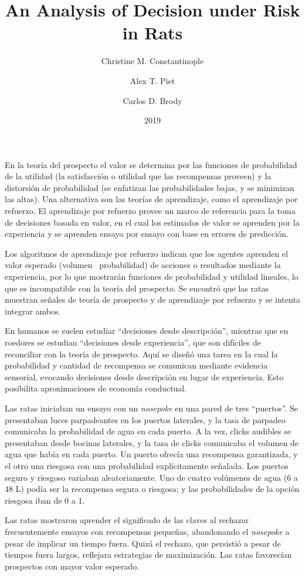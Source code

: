\documentclass[a4paper,12pt]{article}
\title{An Analysis of Decision under Risk in Rats}
\author{Christine M. Constantinople \and Alex T. Piet \and Carlos D. Brody}
\date{2019}
\begin{document}
{\scshape\bfseries \maketitle}

En la teoría del prospecto el valor se determina por las funciones de probabilidad de la utilidad (la satisfacción o utilidad que las recompensas proveen) y la distorsión de probabilidad (se enfatizan las probabilidades bajas, y se minimizan las altas).
Una alternativa son las teorías de aprendizaje, como el aprendizaje por refuerzo.
El aprendizaje por refuerzo provee un marco de referencia para la toma de decisiones basada en valor, en el cual los estimados de valor se aprenden por la experiencia y se aprenden ensayo por ensayo con base en errores de predicción.

Los algoritmos de aprendizaje por refuerzo indican que los agentes aprenden el valor esperado (volumen \texttimes\ probabilidad) de acciones o resultados mediante la experiencia, por lo que mostrarán funciones de probabilidad y utilidad lineales, lo que es incompatible con la teoría del prospecto.
Se encontró que las ratas muestran señales de teoría de prospecto y de aprendizaje por refuerzo y se intenta integrar ambos.

En humanos se suelen estudiar ``decisiones desde descripción'', mientras que en roedores se estudian ``decisiones desde experiencia'', que son difíciles de reconciliar con la teoría de prospecto.
Aquí se diseñó una tarea en la cual la probabilidad y cantidad de recompensa se comunican mediante evidencia sensorial, evocando decisiones desde descripción en lugar de experiencia.
Esto posibilita aproximaciones de economía conductual.

Las ratas iniciaban un ensayo con un {\itshape nosepoke} en una pared de tres ``puertos''.
Se presentaban luces parpadeantes en los puertos laterales, y la tasa de parpadeo comunicaba la probabilidad de agua en cada puerto.
A la vez, clicks audibles se presentaban desde bocinas laterales, y la tasa de clicks comunicaba el volumen de agua que había en cada puerto.
Un puerto ofrecía una recompensa garantizada, y el otro una riesgosa con una probabilidad explícitamente señalada.
Los puertos seguro y riesgoso variaban aleatoriamente.
Uno de cuatro volúmenes de agua (6 a 48 \textmu L) podía ser la recompensa segura o riesgosa; y las probabilidades de la opción riesgosa iban de 0 a 1.

Las ratas mostraron aprender el significado de las claves al rechazar frecuentemente ensayos con recompensas pequeñas, abandonando el {\itshape nosepoke} a pesar de implicar un tiempo fuera.
Quizá el rechazo, que persistió a pesar de tiempos fuera largos, reflejara estrategias de maximización.
Las ratas favorecían prospectos con mayor valor esperado.
\end{document}
